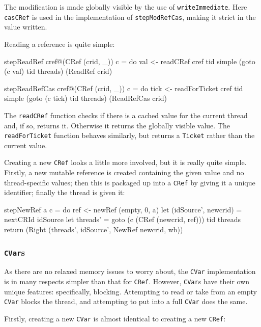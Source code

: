 The modification is made globally visible by the use of
\verb|writeImmediate|. Here \verb|casCRef| is used in the
implementation of \verb|stepModRefCas|, making it strict in the value
written.

Reading a reference is quite simple:

\pagebreak

\begin{haskellcode}
stepReadRef cref@(CRef (crid, _)) c = do
  val <- readCRef cref tid
  simple (goto (c val) tid threads) (ReadRef crid)

stepReadRefCas cref@(CRef (crid, _)) c = do
  tick <- readForTicket cref tid
  simple (goto (c tick) tid threads) (ReadRefCas crid)
\end{haskellcode}

The \verb|readCRef| function checks if there is a cached value for the
current thread and, if so, returns it. Otherwise it returns the
globally visible value. The \verb|readForTicket| function behaves
similarly, but returns a \verb|Ticket| rather than the current value.

Creating a new \verb|CRef| looks a little more involved, but it is
really quite simple. Firstly, a new mutable reference is created
containing the given value and no thread-specific values; then this is
packaged up into a \verb|CRef| by giving it a unique identifier;
finally the thread is given it:

\begin{haskellcode}
stepNewRef a c = do
  ref <- newRef (empty, 0, a)
  let (idSource', newcrid) = nextCRId idSource
  let threads' = goto (c (CRef (newcrid, ref))) tid threads
  return (Right (threads', idSource', NewRef newcrid, wb))
\end{haskellcode}

\subsubsection{\texttt{CVar}s}
\label{sec:execution-stepwise-cvar}

As there are no relaxed memory issues to worry about, the \verb|CVar|
implementation is in many respects simpler than that for
\verb|CRef|. However, \verb|CVar|s have their own unique features:
specifically, blocking. Attempting to read or take from an empty
\verb|CVar| blocks the thread, and attempting to put into a full
\verb|CVar| does the same.

Firstly, creating a new \verb|CVar| is almost identical to creating a
new \verb|CRef|:

